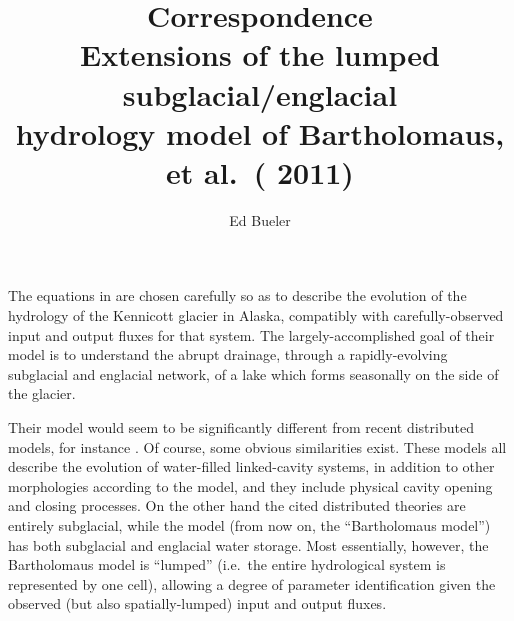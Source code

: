\documentclass[twocolumn,letterpaper]{igs}
\begin{document}
\title{Correspondence \\ Extensions of the lumped subglacial/englacial \\ hydrology model of Bartholomaus, et al.~(
2011)}

\author{Ed Bueler}


\maketitle

The equations in \cite{Bartholomausetal2011} are chosen carefully so as to describe the evolution of the hydrology of the Kennicott glacier in Alaska, compatibly with carefully-observed input and output fluxes for that system.  The largely-accomplished goal of their model is to understand the abrupt drainage, through a rapidly-evolving subglacial and englacial network, of a lake which forms seasonally on the side of the glacier.

Their model would seem to be significantly different from recent distributed models, for instance  \citep{Hewittetal2012,Schoofetal2012}.  Of course, some obvious similarities exist.  These models all describe the evolution of water-filled linked-cavity systems, in addition to other morphologies according to the model, and they include physical cavity opening and closing processes.  On the other hand the cited distributed theories are entirely subglacial, while the \cite{Bartholomausetal2011} model (from now on, the ``Bartholomaus model'') has both subglacial and englacial water storage.  Most essentially, however, the Bartholomaus model is ``lumped'' (i.e.~the entire hydrological system is represented by one cell), allowing a degree of parameter identification given the observed (but also spatially-lumped) input and output fluxes.
\end{document}
